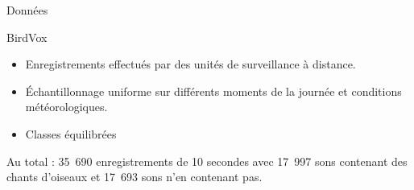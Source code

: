 \documentclass[compress,xcolor=table]{beamer}
\begin{document}
\begin{frame}{Données}

    \begin{exampleblock}{BirdVox}
        \begin{itemize}
            \item Enregistrements effectués par des unités de surveillance à distance.
            \item Échantillonnage uniforme sur différents moments de la journée et conditions météorologiques.
            \item Classes équilibrées
        \end{itemize}
    \end{exampleblock}

    Au total : 35~690 enregistrements de 10 secondes avec 17~997 sons contenant des chants d'oiseaux et 17~693 sons n'en contenant pas.

\end{frame}
\end{document}
